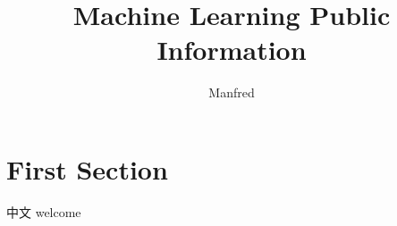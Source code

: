 \documentclass{article}
\author{Manfred}
\title{Machine Learning Public Information}
\begin{document}
\maketitle
\newpage

\tableofcontents
\newpage

\listoftables
\newpage

\listoffigures
\newpage

\section{First Section}
中文
welcome
\end{document}
